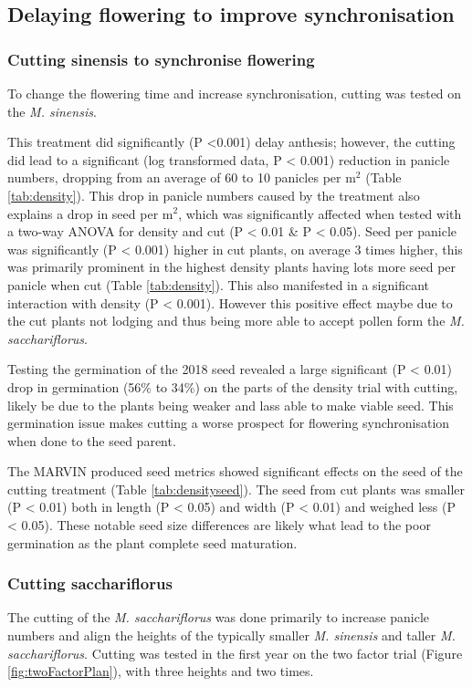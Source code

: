 \documentclass[fleqn, 15pt, lineno]{olplainarticle}
\begin{document}
\FloatBarrier
\subsection{Delaying flowering to improve synchronisation}

\FloatBarrier
\subsubsection{Cutting sinensis to synchronise flowering}
To change the flowering time and increase synchronisation, cutting was tested on the \textit{M. sinensis}.

This treatment did significantly (P <0.001) delay anthesis; however, the cutting did lead to a significant (log transformed data, P < 0.001) reduction in panicle numbers, dropping from an average of 60 to 10 panicles per m$^2$ (Table \ref{tab:density}).
This drop in panicle numbers caused by the treatment also explains a drop in seed per m$^2$, which was significantly affected when tested with a two-way ANOVA for density and cut (P < 0.01 \& P < 0.05).
Seed per panicle was significantly (P < 0.001) higher in cut plants, on average 3 times higher, this was primarily prominent in the highest density plants having lots more seed per panicle when cut (Table \ref{tab:density}).
This also manifested in a significant interaction with density (P < 0.001).
However this positive effect maybe due to the cut plants not lodging and thus being more able to accept pollen form the \textit{M. sacchariflorus}.

Testing the germination of the 2018 seed revealed a large significant (P < 0.01) drop in germination (56\% to 34\%) on the parts of the density trial with cutting, likely be due to the plants being weaker and lass able to make viable seed.
This germination issue makes cutting a worse prospect for flowering synchronisation when done to the seed parent.

The MARVIN produced seed metrics showed significant effects on the seed of the cutting treatment (Table \ref{tab:densityseed}).
The seed from cut plants was smaller (P < 0.01) both in length (P < 0.05) and width (P < 0.01) and weighed less (P < 0.05).
These notable seed size differences are likely what lead to the poor germination as the plant complete seed maturation.



\FloatBarrier
\subsubsection{Cutting sacchariflorus}
The cutting of the \textit{M. sacchariflorus} was done primarily to increase panicle numbers and align the heights of the typically smaller \textit{M. sinensis} and taller \textit{M. sacchariflorus}.
Cutting was tested in the first year on the two factor trial (Figure \ref{fig:twoFactorPlan}), with three heights and two times.
\end{document}
